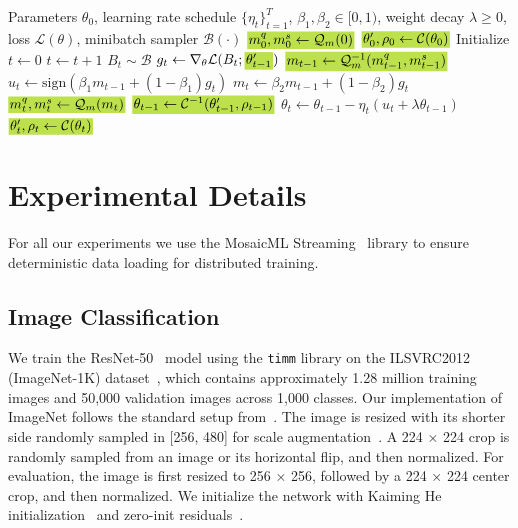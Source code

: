 \documentclass[10pt,twocolumn,letterpaper]{article}
\theoremstyle{plain}
\theoremstyle{definition}
\theoremstyle{remark}
\newcommand{\hlcolor}{SpringGreen}
\newcommand{\hlchange}[1]{{{\fboxsep=1pt\text{\colorbox{\hlcolor}{$#1$}}}}}
\newcommand{\hltext}[1]{\colorbox{\hlcolor}{#1}}
\newcommand{\thetalp}{\theta^\prime}
\begin{document}
\begin{algorithm}[!h]
    \caption{FlashLion: Memory-Efficient Lion. We \hltext{highlight} the changes from Lion.}
    \label{alg:flashlion}
    \begin{algorithmic}[1]
    \Require Parameters $\theta_0$, learning rate schedule $\{\eta_t\}_{t=1}^{T}$, $\beta_1, \beta_2 \in [0,1)$, weight decay $\lambda \geq 0$, loss $\mathcal{L}(\theta)$, minibatch sampler $\mathcal{B}(\cdot)$
    \State $\hlchange{m_0^q, m_0^s \gets \mathcal{Q}_m(0)}$
    \State $\hlchange{\thetalp_0, \rho_0 \gets \mathcal{C}(\theta_0)}$
    \State Initialize $t \gets 0$
        \State $t \gets t + 1$
        \State $B_t \sim \mathcal{B}$
        \State $g_t \gets \nabla_\theta \mathcal{L}(B_t; \hlchange{\thetalp_{t-1}})$
        \State $\hlchange{m_{t-1} \gets \mathcal{Q}_m^{-1}(m^q_{t-1}, m^s_{t-1})}$
        \State $u_t \gets \mathrm{sign}(\beta_1 m_{t-1} + (1 - \beta_1) g_t)$ 
        \State $m_t \gets \beta_2 m_{t-1} + (1 - \beta_2) g_t$
        \State $\hlchange{m^q_t, m^s_t \gets \mathcal{Q}_m(m_t)}$
        \State $\hlchange{\theta_{t-1} \gets \mathcal{C}^{-1}(\thetalp_{t-1}, \rho_{t-1})}$
        \State $\theta_t \gets \theta_{t-1} - \eta_t (u_t + \lambda \theta_{t-1})$
        \State $\hlchange{\thetalp_t, \rho_t \gets \mathcal{C}(\theta_t)}$
    \EndWhile
    \end{algorithmic}
    \end{algorithm}






\section{Experimental Details}

For all our experiments we use the MosaicML Streaming~\citep{mosaicml2022streaming} library to ensure deterministic data loading for distributed training.

\subsection{Image Classification}
\label{sec:appendix_vision}

We train the ResNet-50~\citep{he2016resnet} model using the \texttt{timm} library on the ILSVRC2012 (ImageNet-1K) dataset~\citep{deng2009imagenet}, which contains approximately 1.28 million training images and 50,000 validation images across 1,000 classes. Our implementation of ImageNet follows the standard setup from~\citep{krizhevsky2012imagenet,simonyan2014very}. The image is resized with its shorter side randomly sampled in [256, 480] for scale augmentation~\citep{simonyan2014very}. A 224 × 224 crop is randomly sampled from an image or its horizontal flip, and then normalized. For evaluation, the image is first resized to 256 × 256, followed by a 224 × 224 center crop, and then normalized.
We initialize the network with Kaiming He initialization~\citep{he2016identity} and zero-init residuals~\citep{he2016resnet}.
\end{document}
